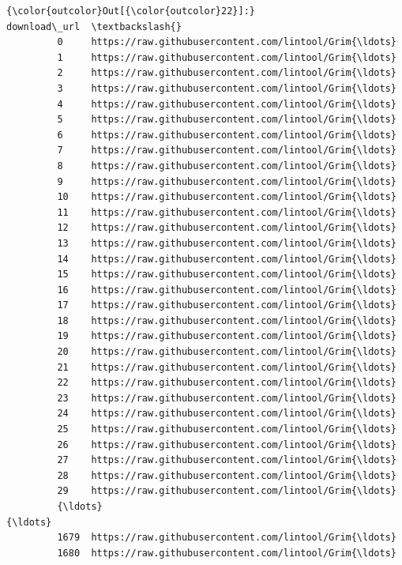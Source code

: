 \documentclass[11pt]{article}
\begin{document}
\begin{Verbatim}[commandchars=\\\{\}]
{\color{outcolor}Out[{\color{outcolor}22}]:}                                            download\_url  \textbackslash{}
         0     https://raw.githubusercontent.com/lintool/Grim{\ldots}   
         1     https://raw.githubusercontent.com/lintool/Grim{\ldots}   
         2     https://raw.githubusercontent.com/lintool/Grim{\ldots}   
         3     https://raw.githubusercontent.com/lintool/Grim{\ldots}   
         4     https://raw.githubusercontent.com/lintool/Grim{\ldots}   
         5     https://raw.githubusercontent.com/lintool/Grim{\ldots}   
         6     https://raw.githubusercontent.com/lintool/Grim{\ldots}   
         7     https://raw.githubusercontent.com/lintool/Grim{\ldots}   
         8     https://raw.githubusercontent.com/lintool/Grim{\ldots}   
         9     https://raw.githubusercontent.com/lintool/Grim{\ldots}   
         10    https://raw.githubusercontent.com/lintool/Grim{\ldots}   
         11    https://raw.githubusercontent.com/lintool/Grim{\ldots}   
         12    https://raw.githubusercontent.com/lintool/Grim{\ldots}   
         13    https://raw.githubusercontent.com/lintool/Grim{\ldots}   
         14    https://raw.githubusercontent.com/lintool/Grim{\ldots}   
         15    https://raw.githubusercontent.com/lintool/Grim{\ldots}   
         16    https://raw.githubusercontent.com/lintool/Grim{\ldots}   
         17    https://raw.githubusercontent.com/lintool/Grim{\ldots}   
         18    https://raw.githubusercontent.com/lintool/Grim{\ldots}   
         19    https://raw.githubusercontent.com/lintool/Grim{\ldots}   
         20    https://raw.githubusercontent.com/lintool/Grim{\ldots}   
         21    https://raw.githubusercontent.com/lintool/Grim{\ldots}   
         22    https://raw.githubusercontent.com/lintool/Grim{\ldots}   
         23    https://raw.githubusercontent.com/lintool/Grim{\ldots}   
         24    https://raw.githubusercontent.com/lintool/Grim{\ldots}   
         25    https://raw.githubusercontent.com/lintool/Grim{\ldots}   
         26    https://raw.githubusercontent.com/lintool/Grim{\ldots}   
         27    https://raw.githubusercontent.com/lintool/Grim{\ldots}   
         28    https://raw.githubusercontent.com/lintool/Grim{\ldots}   
         29    https://raw.githubusercontent.com/lintool/Grim{\ldots}   
         {\ldots}                                                 {\ldots}   
         1679  https://raw.githubusercontent.com/lintool/Grim{\ldots}   
         1680  https://raw.githubusercontent.com/lintool/Grim{\ldots}   

\end{Verbatim}
\end{document}
